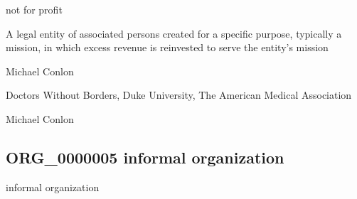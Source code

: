 \documentclass[letterpaper,10pt,english]{sphinxmanual}
\begin{document}
\begin{sphinxShadowBox}

\sphinxAtStartPar
not for profit
\end{sphinxShadowBox}

\begin{sphinxShadowBox}

\sphinxAtStartPar
A legal entity of associated persons created for a specific purpose, typically a mission, in which excess revenue is reinvested to serve the entity’s mission
\end{sphinxShadowBox}

\begin{sphinxShadowBox}

\sphinxAtStartPar
Michael Conlon 
\end{sphinxShadowBox}

\begin{sphinxShadowBox}

\sphinxAtStartPar
Doctors Without Borders, Duke University, The American Medical Association
\end{sphinxShadowBox}

\begin{sphinxShadowBox}

\sphinxAtStartPar
Michael Conlon 
\end{sphinxShadowBox}
\begin{quote}

\ignorespaces \end{quote}


\subsection{ORG\_0000005 \sphinxhyphen{} informal organization}
\label{\detokenize{doc-ORG_0000005:org-0000005-informal-organization}}\label{\detokenize{doc-ORG_0000005:index-0}}\label{\detokenize{doc-ORG_0000005::doc}}
\begin{sphinxShadowBox}

\sphinxAtStartPar
informal organization
\end{sphinxShadowBox}
\end{document}

